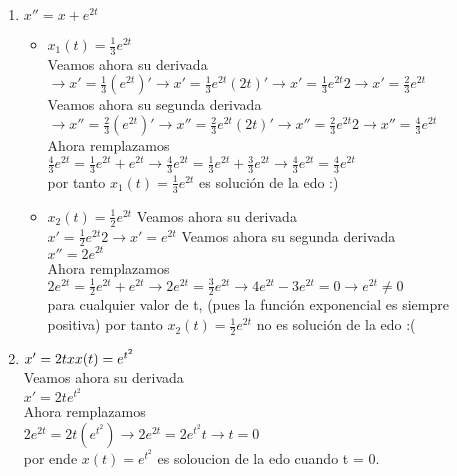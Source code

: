 \documentclass{book}
\begin{document}
    \begin{enumerate}
        \item $x''= x +e^{2t}$
            \begin{itemize}
                \item  $x_{1}(t)=\frac{1}{3}e^{2t}$\\
                Veamos ahora su derivada\\
                $\rightarrow x'=\frac{1}{3}(e^{2t})' \rightarrow x'=\frac{1}{3}e^{2t}(2t)' \rightarrow x'=\frac{1}{3}e^{2t}2
                \rightarrow x'=\frac{2}{3}e^{2t}$\\
                Veamos ahora su segunda derivada\\
                $\rightarrow x''=\frac{2}{3}(e^{2t})' \rightarrow x''=\frac{2}{3}e^{2t}(2t)' \rightarrow x''=\frac{2}{3}e^{2t}2
                \rightarrow x''=\frac{4}{3}e^{2t}$\\ 
                Ahora remplazamos\\
                $\frac{4}{3}e^{2t}= \frac{1}{3}e^{2t} +e^{2t} \rightarrow \frac{4}{3}e^{2t} =  \frac{1}{3}e^{2t} + \frac{3}{3}e^{2t} 
                \rightarrow \frac{4}{3}e^{2t} = \frac{4}{3}e^{2t}$
                \\ por tanto $x_{1}(t)=\frac{1}{3}e^{2t}$ es solución de la edo :)
                
                \item $x_{2}(t)=\frac{1}{2}e^{2t}$
                Veamos ahora su derivada\\
                $x'=\frac{1}{2}e^{2t}2 \rightarrow x'=e^{2t}$
                Veamos ahora su segunda derivada\\
                $x''= 2e^{2t}$\\ 
                Ahora remplazamos\\
                $2e^{2t}= \frac{1}{2}e^{2t} + e^{2t} \rightarrow 2e^{2t} =  \frac{3}{2}e^{2t} \rightarrow 4e^{2t} - 3e^{2t} =0
                \rightarrow e^{2t} \not = 0$\\ para cualquier valor de t, (pues la función exponencial es siempre positiva) 
                por tanto $x_{2}(t)=\frac{1}{2}e^{2t}$ no es solución de la edo :(
            \end{itemize}
       

        

        \item $x'=2tx\\  x(t)=e^{t^{2}}$\\ 
        Veamos ahora su derivada\\
        $x'=2te^{t^{2}}$\\
        Ahora remplazamos\\
        $2e^{2t}= 2t(e^{t^{2}}) \rightarrow 2e^{2t}= 2e^{t^{2}}t \rightarrow t = 0$\\
        por ende $x(t)=e^{t^{2}}$ es soloucion de la edo cuando t = 0. 
        

\end{enumerate}
\end{document}
